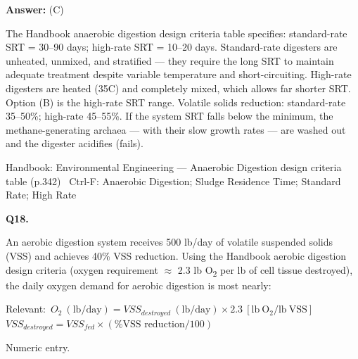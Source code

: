 \documentclass[11pt]{article}
\begin{document}
\vspace{2pt}\par\noindent\colorbox{boxbg}{\parbox{\dimexpr\linewidth-2\fboxsep\relax}{%
\vspace{2pt}\textbf{Answer:} (C)\par\vspace{2pt}
{\small The Handbook anaerobic digestion design criteria table specifies: standard-rate SRT = 30--90 days; high-rate SRT = 10--20 days. Standard-rate digesters are unheated, unmixed, and stratified --- they require the long SRT to maintain adequate treatment despite variable temperature and short-circuiting. High-rate digesters are heated (35\textdegree{}C) and completely mixed, which allows far shorter SRT. Option (B) is the high-rate SRT range. Volatile solids reduction: standard-rate 35--50\%; high-rate 45--55\%. If the system SRT falls below the minimum, the methane-generating archaea --- with their slow growth rates --- are washed out and the digester acidifies (fails).}\par\vspace{2pt}
{\footnotesize\color{soft}Handbook: Environmental Engineering --- Anaerobic Digestion design criteria table (p.342) \textbullet\ Ctrl-F: Anaerobic Digestion; Sludge Residence Time; Standard Rate; High Rate}\vspace{2pt}
}}
\vspace{9pt}
\filbreak
\textbf{\color{accent}Q18.}\par\vspace{2pt}
An aerobic digestion system receives 500 lb/day of volatile suspended solids (VSS) and achieves 40\% VSS reduction. Using the Handbook aerobic digestion design criteria (oxygen requirement $\approx$ 2.3 lb O\textsubscript{2} per lb of cell tissue destroyed), the daily oxygen demand for aerobic digestion is most nearly:\par\vspace{3pt}
{\small\color{soft}Relevant:}\ $O_2\ (\mathrm{lb/day}) = VSS_{destroyed}\ (\mathrm{lb/day})\times 2.3\ [\mathrm{lb\ O_2/lb\ VSS}]$ \quad $VSS_{destroyed} = VSS_{fed}\times (\text{\%VSS reduction}/100)$\par\vspace{3pt}
{\small\color{soft}Numeric entry.}\par\vspace{3pt}
\end{document}
